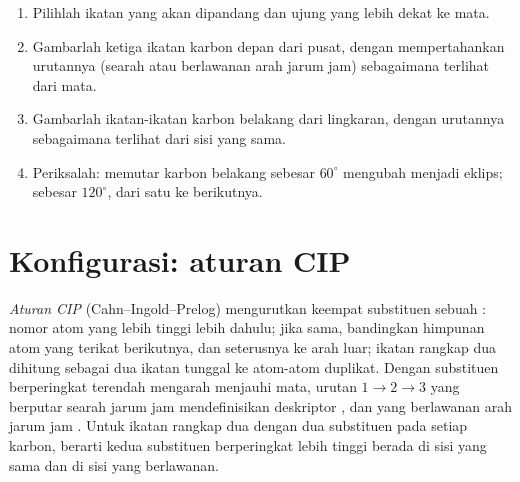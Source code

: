 \begin{method}\label{met:b1:stereochemistry-in-depth:newman-from-cram}
\begin{enumerate}
  \item Pilihlah ikatan yang akan dipandang dan ujung yang lebih dekat ke
        mata.
  \item Gambarlah ketiga ikatan karbon depan dari pusat, dengan
        mempertahankan urutannya (searah atau berlawanan arah jarum jam)
        sebagaimana terlihat dari mata.
  \item Gambarlah ikatan-ikatan karbon belakang dari lingkaran, dengan
        urutannya sebagaimana terlihat dari sisi yang sama.
  \item Periksalah: memutar karbon belakang sebesar $60^\circ$ mengubah
         menjadi eklips; sebesar $120^\circ$, dari satu
         ke  berikutnya.
\end{enumerate}
\end{method}

\section{Konfigurasi: aturan CIP}

\begin{definition}\label{def:b1:stereochemistry-in-depth:cip}
\emph{Aturan CIP} (Cahn--Ingold--Prelog) mengurutkan
keempat substituen sebuah : nomor atom yang lebih tinggi
lebih dahulu; jika sama, bandingkan himpunan atom yang terikat
berikutnya, dan seterusnya ke arah luar; ikatan rangkap dua dihitung
sebagai dua ikatan tunggal ke atom-atom duplikat. Dengan substituen
berperingkat terendah mengarah menjauhi mata, urutan $1 \to 2 \to 3$
yang berputar searah jarum jam mendefinisikan deskriptor , dan
yang berlawanan arah jarum jam . Untuk ikatan rangkap dua dengan
dua substituen pada setiap karbon,  berarti kedua substituen
berperingkat lebih tinggi berada di sisi yang sama dan  di sisi
yang berlawanan.
\end{definition}

